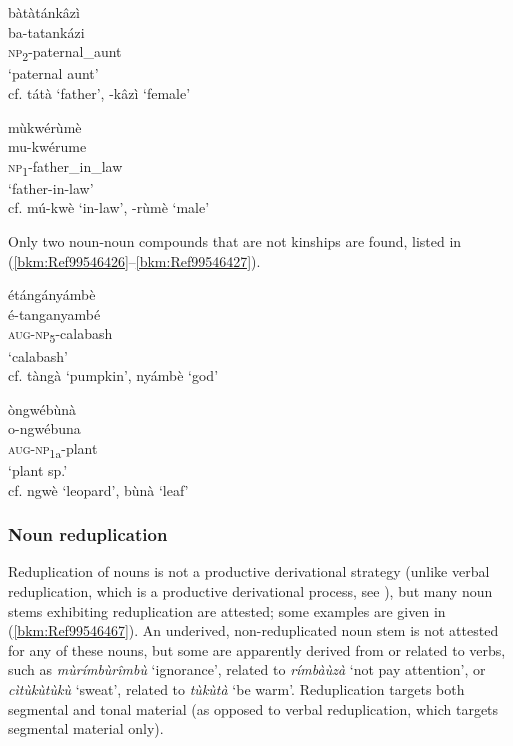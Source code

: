 \ea
\glll bàtàtánkâzì\\
ba-tatankázi\\
\textsc{np}\textsubscript{2}-paternal\_aunt\\
\glt ‘paternal aunt’\\
 cf. tátà ‘father’, -kâzì ‘female’
\z

\ea
\label{bkm:Ref99546406}
\glll mùkwérùmè\\
mu-kwérume\\
\textsc{np}\textsubscript{1}-father\_in\_law\\
\glt ‘father-in-law’\\
 cf. mú-kwè ‘in-law’, -rùmè ‘male’
\z

Only two noun-noun compounds that are not kinships are found, listed in (\ref{bkm:Ref99546426}--\ref{bkm:Ref99546427}).

\ea
\label{bkm:Ref99546426}
\glll étángányámbè\\
é-tanganyambé\\
\textsc{aug}-\textsc{np}\textsubscript{5}-calabash\\
\glt ‘calabash’\\
 cf. tàngà ‘pumpkin’, nyámbè ‘god’
\z

\ea
\label{bkm:Ref99546427}
\glll òngwébùnà\\
o-ngwébuna\\
\textsc{aug}-\textsc{np}\textsubscript{1a}-plant\\
\glt ‘plant sp.’\\
 cf. ngwè ‘leopard’, bùnà ‘leaf’
\z

\subsubsection{Noun reduplication}
\begin{sloppypar}
Reduplication of nouns is not a productive derivational strategy (unlike verbal reduplication, which is a productive derivational process, see ), but many noun stems exhibiting reduplication are attested; some examples are given in (\ref{bkm:Ref99546467}). An underived, non-reduplicated noun stem is not attested for any of these nouns, but some are apparently derived from or related to verbs, such as \textit{mùrímbùrîmbù} ‘ignorance’, related to \textit{rímbàùzà} ‘not pay attention’, or \textit{cìtùkùtùkù} ‘sweat’, related to \textit{tùkùtà} ‘be warm’. Reduplication targets both segmental and tonal material (as opposed to verbal reduplication, which targets segmental material only).
\end{sloppypar}

